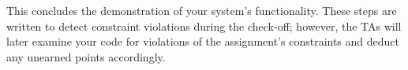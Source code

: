 
This concludes the demonstration of your system's functionality. These steps
are written to detect constraint violations during the check-off; however, the
TAs will later examine your code for violations of the assignment's constraints
and deduct any unearned points accordingly.


